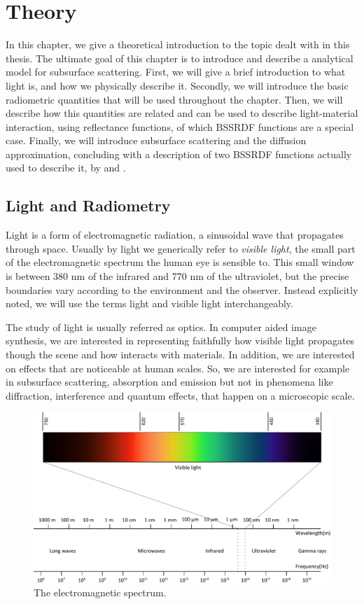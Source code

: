 \chapter{Theory}

In this chapter, we give a theoretical introduction to the topic dealt with in this thesis. The ultimate goal of this chapter is to introduce and describe a analytical model for subsurface scattering. First, we will give a brief introduction to what light is, and how we physically describe it. Secondly, we will introduce the basic radiometric quantities that will be used throughout the chapter. Then, we will describe how this quantities are related and can be used to describe light-material interaction, using reflectance functions, of which BSSRDF functions are a special case. Finally, we will introduce subsurface scattering and the diffusion approximation, concluding with a description of two BSSRDF functions actually used to describe it, by \cite{Jensen:2001:PMS:383259.383319} and \cite{IMM2013-06646}.

\section{Light and Radiometry}
Light is a form of electromagnetic radiation, a sinusoidal wave that propagates through space. Usually by light we generically refer to \emph{visible light}, the small part of the electromagnetic spectrum the human eye is sensible to. This small window is between 380 nm of the infrared and 770 nm of the ultraviolet, but the precise boundaries vary according to the environment and the observer. Instead explicitly noted, we will use the terms light and visible light interchangeably.

The study of light is usually referred as optics. In computer aided image synthesis, we are interested in representing faithfully how visible light propagates though the scene and how interacts with materials. In addition, we are interested on effects that are noticeable at human scales. So, we are interested for example in subsurface scattering, absorption and emission but not in phenomena like diffraction, interference and quantum effects, that happen on a microscopic scale. 

\begin{figure}[!ht]
\centering
\includegraphics[width=1.0\textwidth]{images/spectrum.pdf}
\caption{The electromagnetic spectrum.}
\label{fig:spectrum}
\end{figure}

